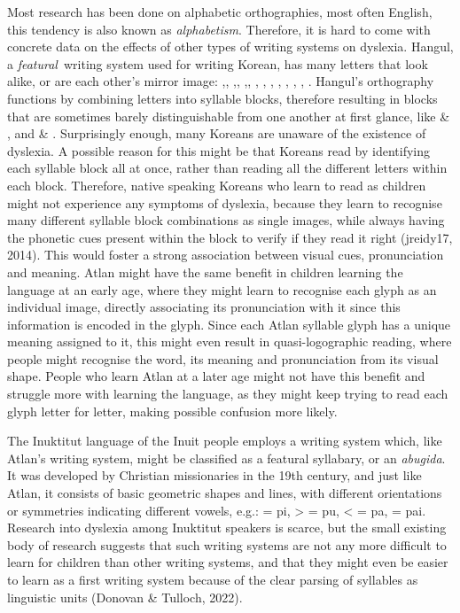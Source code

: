 Most research has been done on alphabetic orthographies, most often English, this tendency is also known as {\it alphabetism}. Therefore, it is hard to come with concrete data on the effects of other types of writing systems on dyslexia. Hangul, a {\it featural}\ writing system used for writing Korean, has many letters that look alike, or are each other’s mirror image: ,, ,, ,, , , , , , , , . Hangul’s orthography functions by combining letters into syllable blocks, therefore resulting in blocks that are sometimes barely distinguishable from one another at first glance, like  \& , and  \& . Surprisingly enough, many Koreans are unaware of the existence of dyslexia. A possible reason for this might be that Koreans read by identifying each syllable block all at once, rather than reading all the different letters within each block. Therefore, native speaking Koreans who learn to read as children might not experience any symptoms of dyslexia, because they learn to recognise many different syllable block combinations as single images, while always having the phonetic cues present within the block to verify if they read it right (jreidy17, 2014). This would foster a strong association between visual cues, pronunciation and meaning. Atlan might have the same benefit in children learning the language at an early age, where they might learn to recognise each glyph as an individual image, directly associating its pronunciation with it since this information is encoded in the glyph. Since each Atlan syllable glyph has a unique meaning assigned to it, this might even result in quasi-logographic reading, where people might recognise the word, its meaning and pronunciation from its visual shape. People who learn Atlan at a later age might not have this benefit and struggle more with learning the language, as they might keep trying to read each glyph letter for letter, making possible confusion more likely. 

The Inuktitut language of the Inuit people employs a writing system which, like Atlan’s writing system, might be classified as a featural syllabary, or an {\it abugida}. It was developed by Christian missionaries in the 19th century, and just like Atlan, it consists of basic geometric shapes and lines, with different orientations or symmetries indicating different vowels, e.g.:  = pi, > = pu, < = pa,  = pai. Research into dyslexia among Inuktitut speakers is scarce, but the small existing body of research suggests that such writing systems are not any more difficult to learn for children than other writing systems, and that they might even be easier to learn as a first writing system because of the clear parsing of syllables as linguistic units (Donovan \& Tulloch, 2022).  

